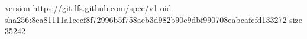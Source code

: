 version https://git-lfs.github.com/spec/v1
oid sha256:8ea81111a1cccf8f72996b5f758aeb3d982b90c9dbf990708eabcafcfd133272
size 35242
